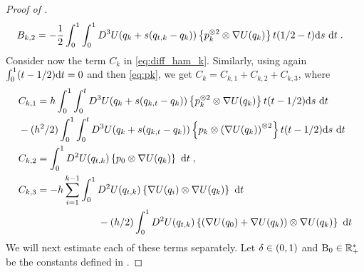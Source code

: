 \begin{proof}[Proof of ]
\begin{align}
\label{eq:definition-B_k-2}
B_{k,2} &=  -\frac{1}{2} \int_{0}^1 \int_0^1 D^3 U(q_{k} +s(q_{t,k} - q_{k})) \left\lbrace p_{k}^{\otimes 2} \otimes \nabla U(q_k)  \right\rbrace t (1/2-t)\mathrm{d} s \ \mathrm{d} t \;.
\end{align}
Consider now the term $C_k$ in \eqref{eq:diff_ham_k}. Similarly, using again $\int_0^1 (t- 1/2) \mathrm{d} t= 0$ and then \eqref{eq:pk}, we get $C_k = C_{k,1} +  C_{k,2} + C_{k,3}$,  where
\begin{align}
\label{eq:definition-C_k-1}
&C_{k,1} = h \int_{0}^1 \int_{0}^t D^3 \F(q_{k} +s(q_{k,t} - q_{k})) \defEns{p_{k}^{\otimes 2} \otimes \nabla \F(q_k) } t (t-1/2)\rmd s \ \rmd t \\
\nonumber
& -(h^2/2)\int_{0}^1 \int_{0}^t  D^3 \F(q_{k} +s(q_{k,t} - q_{k})) \defEns{p_{k} \otimes \parenthese{\nabla \F(q_k)}^{\otimes 2} } t (t-1/2)\rmd s \ \rmd t \\
\label{eq:definition-C_k-2}
&C_{k,2} =   \int_0^1D^2\F(q_{t,k})\defEns{p_{0}\otimes \nabla \F(q_{k})} \ \rmd t \eqsp, \\
\label{eq:definition-C_k-3}
&C_{k,3} = -h \sum_{i=1}^{k-1}\int_0^1D^2\F(q_{t,k})\defEns{\nabla \F(q_i)\otimes \nabla \F(q_{k})} \ \rmd t
\\
&\qquad \qquad  \qquad \qquad - (h/2)\int_0^1D^2\F(\q_{t,k})\defEns{\parenthese{\nabla \F(\q_0)+\nabla \F (\q_k)} \otimes \nabla \F(\q_{k})} \ \rmd t
\end{align}
We will next estimate each of these terms separately.
Let $\delta \in \left(0,1\right)$ and $\operatorname{B}_0 \in \mathbb{R}_+^*$ be the constants defined in .



\end{proof}
